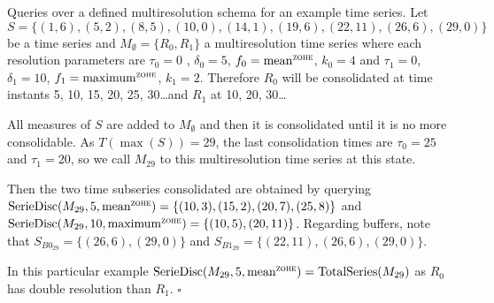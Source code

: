 \begin{example} Queries over a defined multiresolution schema for an
  example time series.  Let $S = \{ (1,6),(5,2),\allowbreak
  (8,5),(10,0),\allowbreak (14,1),\allowbreak (19,6),\allowbreak
  (22,11),\allowbreak (26,6),(29,0) \}$ be a time series and
  $M_\emptyset=\{R_0,R_1\}$ a multiresolution time series where each
  resolution parameters are $\tau_0=0$ , $\delta_0=5$, $f_0 =\meanz$,
  $k_0=4$ and $\tau_1=0$, $\delta_1=10$, $f_1 =\maxz$,
  $k_1=2$. Therefore $R_0$ will be consolidated at time instants 5,
  10, 15, 20, 25, 30\dots and $R_1$ at 10, 20, 30\dots

  All measures of $S$ are added to $M_\emptyset$
  and then it is consolidated until it is no more consolidable. As
  $T(\max(S))=29$, the last consolidation times are $\tau_0=25$ and
  $\tau_1=20$, so we call $M_{29}$ to this multiresolution time series
  at this state.

  Then the two time subseries consolidated are obtained by querying
  $\seriedisc(M_{29},5,\meanz)=\{(10,3),(15,2),(20,7),\allowbreak
  (25,8)\}$ and $\seriedisc(M_{29},10,\maxz)=\{(10,5),\break
  (20,11)\}$. Regarding buffers, note that $S_{B0_{29}}=
  \{(26,6),\allowbreak (29,0)\}$ and $S_{B1_{29}}=\{(22,11),(26,6),(29,0)\}$.

  In this particular example $\seriedisc(M_{29},5,\meanz)=\break
  \totalseries(M_{29})$ as $R_0$ has double resolution than
  $R_1$. $\square$
\end{example}







